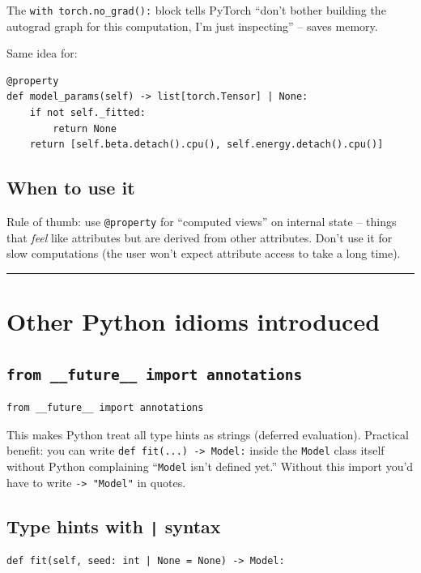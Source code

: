 \documentclass[11pt]{article}
\begin{document}
The \texttt{with torch.no\_grad():} block tells PyTorch ``don't bother
building the autograd graph for this computation, I'm just inspecting'' --
saves memory.

Same idea for:
\begin{lstlisting}
@property
def model_params(self) -> list[torch.Tensor] | None:
    if not self._fitted:
        return None
    return [self.beta.detach().cpu(), self.energy.detach().cpu()]
\end{lstlisting}

\subsection{When to use it}

Rule of thumb: use \texttt{@property} for ``computed views'' on internal
state -- things that \emph{feel} like attributes but are derived from other
attributes. Don't use it for slow computations (the user won't expect
attribute access to take a long time).

\bigskip
\hrule
\bigskip

\section{Other Python idioms introduced}

\subsection{\texttt{from \_\_future\_\_ import annotations}}

\begin{lstlisting}
from __future__ import annotations
\end{lstlisting}

This makes Python treat all type hints as strings (deferred evaluation).
Practical benefit: you can write \texttt{def fit(...) -> Model:} inside the
\texttt{Model} class itself without Python complaining ``\texttt{Model} isn't
defined yet.'' Without this import you'd have to write \texttt{-> "Model"} in
quotes.

\subsection{Type hints with \texttt{|} syntax}

\begin{lstlisting}
def fit(self, seed: int | None = None) -> Model:
\end{lstlisting}
\end{document}
